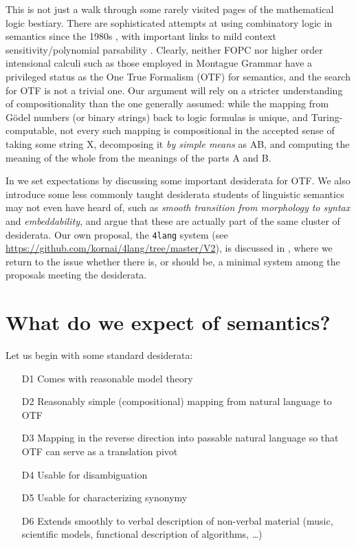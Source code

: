 \documentclass[output=paper]{langscibook}
\begin{document}
This is not just a walk through some rarely visited pages of the mathematical
logic bestiary. There are sophisticated attempts at using combinatory logic in
semantics since the 1980s \citep{Szabolcsi:1987,Steedman:1987,Jacobson:1999,Baldridge:2002}, with
important links to mild context sensitivity\slash polynomial parsability
\citep{Joshi:1990}. Clearly, neither FOPC nor higher order intensional calculi
such as those employed in Montague Grammar have a privileged status as the One True
Formalism (OTF) for semantics, and the search for OTF is not a trivial one. Our
argument will rely on a stricter understanding of compositionality than the
one generally assumed: while the mapping from Gödel numbers (or binary
strings) back to logic formulas is unique, and Turing-computable, not every
such mapping is compositional in the accepted sense of taking some string X,
decomposing it \textit{by simple means} as AB, and computing the meaning of
the whole from the meanings of the parts A and B.\largerpage[-1]

In  we set expectations by discussing some important
desiderata for OTF.  We also introduce some less commonly taught desiderata
students of linguistic semantics may not even have heard of, such as 
\textit{smooth transition from morphology to syntax} and \textit{embeddability}, and
argue that these are actually part of the same cluster of desiderata.  Our own
proposal, the \texttt{4lang} system (see \url{https://github.com/kornai/4lang/tree/master/V2}), is discussed in
, where we return to the issue whether there is, or should
be, a minimal system among the proposals meeting the desiderata.

\section{What do we expect of semantics?}\label{expect}

Let us begin with some standard desiderata: 

\begin{enumerate}
\item[D1] Comes with reasonable model theory
\item[D2] Reasonably simple (compositional) mapping from natural language to
  OTF
\item[D3] Mapping in the reverse direction into passable natural language so that
  OTF can serve as a translation pivot
\item[D4] Usable for disambiguation
\item[D5] Usable for characterizing synonymy
\item[D6] Extends smoothly to verbal description of non-verbal material (music,
  scientific models, functional description of algorithms, \ldots)
\end{enumerate}
\end{document}
